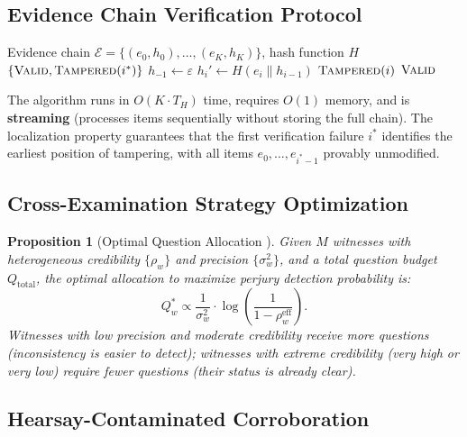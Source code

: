 \documentclass[11pt,a4paper]{article}
\newtheorem{proposition}[theorem]{Proposition}
\theoremstyle{definition}
\newcommand{\evidenceChain}{\mathcal{E}}        %
\newcommand{\hashFunc}{H}                       %
\begin{document}
\subsection{Evidence Chain Verification Protocol }

\begin{algorithm}[ht]
\caption{Evidence Chain Verification }
\label{alg:chain_verify}
\begin{algorithmic}[1]
\Require Evidence chain $\evidenceChain = \{(e_0, h_0), \ldots, (e_K, h_K)\}$, hash function $\hashFunc$
\Ensure $\{\textsc{Valid}, \textsc{Tampered}(i^*)\}$
\State $h_{-1} \gets \varepsilon$
    \State $h_i' \gets \hashFunc(e_i \| h_{i-1})$
        \State \Return $\textsc{Tampered}(i)$
    \EndIf
\EndFor
\State \Return $\textsc{Valid}$
\end{algorithmic}
\end{algorithm}

The algorithm runs in $O(K \cdot T_{\hashFunc})$ time, requires $O(1)$ memory, and is \textbf{streaming} (processes items sequentially without storing the full chain). The localization property guarantees that the first verification failure $i^*$ identifies the earliest position of tampering, with all items $e_0, \ldots, e_{i^*-1}$ provably unmodified.

\subsection{Cross-Examination Strategy Optimization }

\begin{proposition}[Optimal Question Allocation ]
\label{prop:optimal_questions}
Given $M$ witnesses with heterogeneous credibility $\{\rho_w\}$ and precision $\{\sigma_w^2\}$, and a total question budget $Q_{\mathrm{total}}$, the optimal allocation to maximize perjury detection probability is:
\begin{equation}
    Q_w^* \propto \frac{1}{\sigma_w^2} \cdot \log\left(\frac{1}{1 - \rho_w^{\mathrm{eff}}}\right).
    \label{eq:optimal_Q}
\end{equation}
Witnesses with low precision and moderate credibility receive \textit{more} questions (inconsistency is easier to detect); witnesses with extreme credibility (very high or very low) require fewer questions (their status is already clear).
\end{proposition}

\subsection{Hearsay-Contaminated Corroboration }
\end{document}
